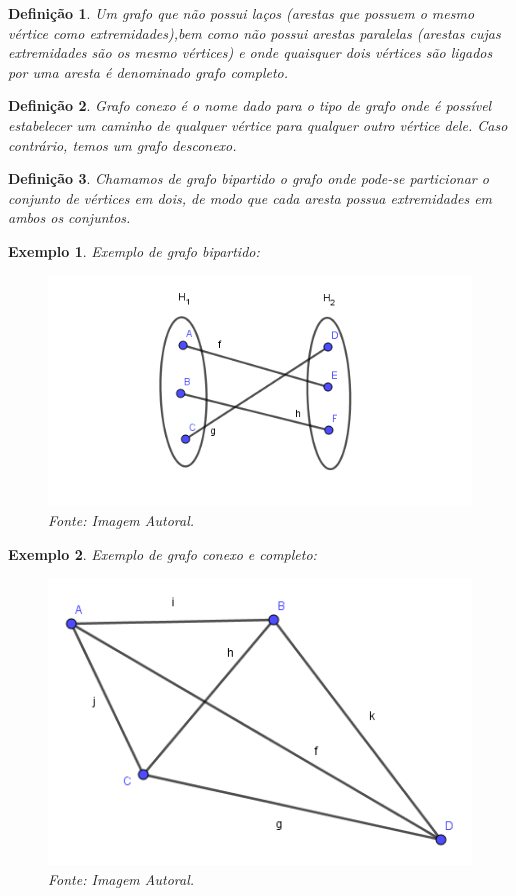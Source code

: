 \documentclass[
	12pt,				%
	openright,			%
	twoside,			%
	a4paper,			%
	english,			%
	french,				%
	spanish,			%
	brazil				%
	]{abntex2}
\newtheorem{exemplo}{Exemplo}[section]
\newtheorem{definicao}{Definição}[section]
\begin{document}
\begin{definicao}
Um grafo que não possui laços (arestas que possuem o mesmo vértice como extremidades),bem como não possui arestas paralelas (arestas cujas extremidades são os mesmo vértices) e onde quaisquer dois vértices são ligados por uma aresta é denominado \textit{grafo completo}.
\end{definicao}

\begin{definicao}
\textit{Grafo conexo} é o nome dado para o tipo de grafo onde é possível estabelecer um caminho de qualquer vértice para qualquer outro vértice dele. Caso contrário, temos um \textit{grafo desconexo}.
\end{definicao}

\begin{definicao}
Chamamos de \textit{grafo bipartido} o grafo onde pode-se particionar o conjunto de vértices em dois, de modo que cada aresta possua extremidades em ambos os conjuntos.
\end{definicao}

\begin{exemplo}
Exemplo de grafo bipartido:
\begin{figure}[h]
    \centering
    \includegraphics[scale=0.63]{10.png}
    \caption{Fonte: Imagem Autoral.}
    \label{figRotulo}
  \end{figure}
 \end{exemplo}
 
\begin{exemplo}
Exemplo de grafo conexo e completo:
\begin{figure}[h]
    \centering
    \includegraphics[scale=0.50]{Grafocompleto.png}
    \caption*{Fonte: Imagem Autoral.}
    \label{figRotulo}
  \end{figure}  
\end{exemplo}
\end{document}
